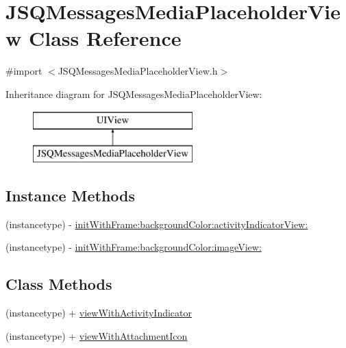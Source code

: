 \hypertarget{interface_j_s_q_messages_media_placeholder_view}{}\section{J\+S\+Q\+Messages\+Media\+Placeholder\+View Class Reference}
\label{interface_j_s_q_messages_media_placeholder_view}


{\ttfamily \#import $<$J\+S\+Q\+Messages\+Media\+Placeholder\+View.\+h$>$}

Inheritance diagram for J\+S\+Q\+Messages\+Media\+Placeholder\+View\+:\begin{figure}[H]
\begin{center}
\leavevmode
\includegraphics[height=2.000000cm]{interface_j_s_q_messages_media_placeholder_view}
\end{center}
\end{figure}
\subsection*{Instance Methods}
\begin{DoxyCompactItemize}
\item 
(instancetype) -\/ \hyperlink{interface_j_s_q_messages_media_placeholder_view_aa66725e24712154dd4bf23cb8f6a5665}{init\+With\+Frame\+:background\+Color\+:activity\+Indicator\+View\+:}
\item 
(instancetype) -\/ \hyperlink{interface_j_s_q_messages_media_placeholder_view_a4e13f2a619172b11b7dd4366ffb5ba8a}{init\+With\+Frame\+:background\+Color\+:image\+View\+:}
\end{DoxyCompactItemize}
\subsection*{Class Methods}
\begin{DoxyCompactItemize}
\item 
(instancetype) + \hyperlink{interface_j_s_q_messages_media_placeholder_view_a9b54e1910ae86b85118b858c5df41490}{view\+With\+Activity\+Indicator}
\item 
(instancetype) + \hyperlink{interface_j_s_q_messages_media_placeholder_view_a1329651c3f302de1fd295e88a7f5fe14}{view\+With\+Attachment\+Icon}
\end{DoxyCompactItemize}
